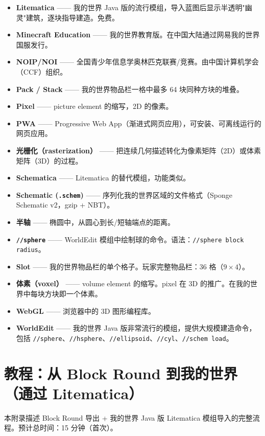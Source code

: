 \documentclass[12pt,a4paper]{scrartcl}
\newcommand{\code}[1]{\texttt{\small #1}}
\newcommand{\acc}[1]{\textcolor{accent}{\textbf{#1}}}
\newcommand{\cmd}[1]{\textcolor{earth}{\texttt{\small #1}}}
\begin{document}
\begin{itemize}[leftmargin=1.4em,itemsep=0.3em,topsep=0.3em]
  \item \acc{Litematica} —— 我的世界 Java 版的流行模组，导入蓝图后显示半透明"幽灵"建筑，逐块指导建造。免费。
  \item \acc{Minecraft Education} —— 我的世界教育版。在中国大陆通过网易我的世界国服发行。
  \item \acc{NOIP/NOI} —— 全国青少年信息学奥林匹克联赛/竞赛。由中国计算机学会（CCF）组织。
  \item \acc{Pack / Stack} —— 我的世界物品栏一格中最多 64 块同种方块的堆叠。
  \item \acc{Pixel} —— picture element 的缩写，2D 的像素。
  \item \acc{PWA} —— Progressive Web App（渐进式网页应用），可安装、可离线运行的网页应用。
  \item \acc{光栅化（rasterization）} —— 把连续几何描述转化为像素矩阵（2D）或体素矩阵（3D）的过程。
  \item \acc{Schematica} —— Litematica 的替代模组，功能类似。
  \item \acc{Schematic (\texttt{.schem})} —— 序列化我的世界区域的文件格式（Sponge Schematic v2，gzip + NBT）。
  \item \acc{半轴} —— 椭圆中，从圆心到长/短轴端点的距离。
  \item \acc{\code{//sphere}} —— WorldEdit 模组中绘制球的命令。语法：\cmd{//sphere block radius}。
  \item \acc{Slot} —— 我的世界物品栏的单个格子。玩家完整物品栏：36 格（$9 \times 4$）。
  \item \acc{体素（voxel）} —— volume element 的缩写。pixel 在 3D 的推广。在我的世界中每块方块即一个体素。
  \item \acc{WebGL} —— 浏览器中的 3D 图形编程库。
  \item \acc{WorldEdit} —— 我的世界 Java 版非常流行的模组，提供大规模建造命令，包括 \cmd{//sphere}、\cmd{//hsphere}、\cmd{//ellipsoid}、\cmd{//cyl}、\cmd{//schem load}。
\end{itemize}

\newpage
\section{教程：从 Block Round 到我的世界（通过 Litematica）}\label{ap:litematica}

本附录描述 Block Round 导出 + 我的世界 Java 版 Litematica 模组导入的完整流程。预计总时间：15 分钟（首次）。
\end{document}
